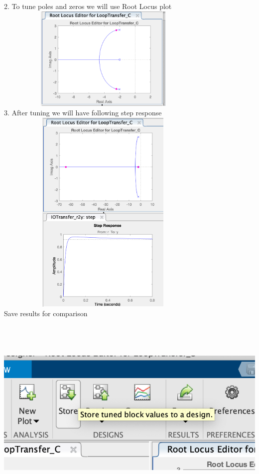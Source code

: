 \documentclass[a4paper,11pt]{article}
\theoremstyle{mytheor}
\begin{document}
2. To tune poles and zeros we will use Root Locus plot
$$$$
\includegraphics[width=10.5cm, height=5cm]{to_tune.png}
$$$$
3. After tuning we will have following step response
$$$$
\includegraphics[width=10.5cm, height=10cm]{after_hand_tuned.png}
$$$$
Save results for comparison
$$$$
\includegraphics[width=15.5cm, height=10cm]{compare.png}
\end{document}
